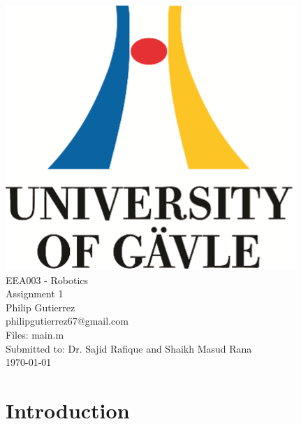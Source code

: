 \documentclass[a4paper, titlepage]{article}
\begin{document}

\begin{titlepage}
  \begin{center}
    \vspace*{1cm}
    \includegraphics[scale=1.0]{../figures/hig_logo_eng.png}\\
    \vspace{1.5cm}
    \large EEA003 - Robotics\\
    \large Assignment 1\\
    \vspace{1.5cm}
    Philip Gutierrez\\
    philipgutierrez67@gmail.com\\
    Files: main.m\\

    \vspace{1cm}
    Submitted to: Dr. Sajid Rafique and Shaikh Masud Rana\\    
    \vspace{1cm}
    \today
  \end{center}
\end{titlepage}

\tableofcontents
\clearpage



\section{Introduction}
\end{document}
